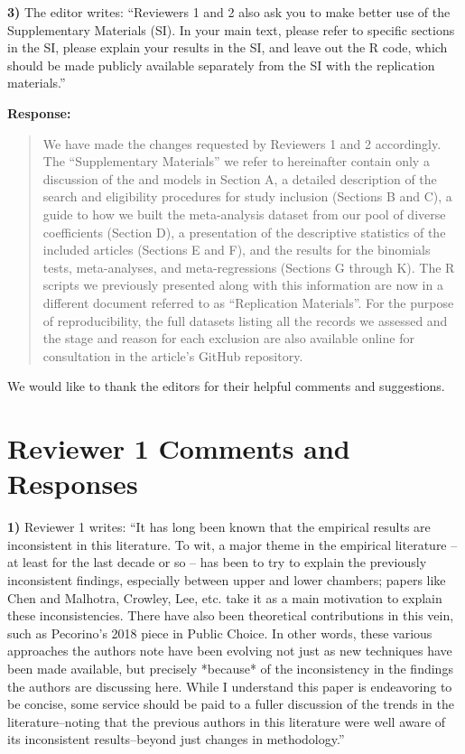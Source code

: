 \documentclass[a4paper,12pt]{article}
\begin{document}
\vspace{.3cm}

\noindent \textbf{3)} The editor writes: ``Reviewers 1 and 2 also ask you to make better use of the Supplementary Materials (SI). In your main text, please refer to specific sections in the SI, please explain your results in the SI, and leave out the R code, which should be made publicly available separately from the SI with the replication materials.''

\vspace{.3cm}

\noindent \textbf{Response:} 
\begin{quote}
    We have made the changes requested by Reviewers 1 and 2 accordingly. The ``Supplementary Materials'' we refer to hereinafter contain only a discussion of the \citet{weingast1981political} and \citet{primo2008distributive} models in Section A, a detailed description of the search and eligibility procedures for study inclusion (Sections B and C), a guide to how we built the meta-analysis dataset from our pool of diverse coefficients (Section D), a presentation of the descriptive statistics of the included articles (Sections E and F), and the results for the binomials tests, meta-analyses, and meta-regressions (Sections G through K). The R scripts we previously presented along with this information are now in a different document referred to as ``Replication Materials''. For the purpose of reproducibility, the full datasets listing all the records we assessed and the stage and reason for each exclusion are also available online for consultation in the article's GitHub repository. 
\end{quote}

\vspace{.3cm}

We would like to thank the editors for their helpful comments and suggestions.

\section*{Reviewer 1 Comments and Responses}

\noindent \textbf{1)} Reviewer 1 writes: ``It has long been known that the empirical results are inconsistent in this literature. To wit, a major theme in the empirical literature -- at least for the last decade or so -- has been to try to explain the previously inconsistent findings, especially between upper and lower chambers; papers like Chen and Malhotra, Crowley, Lee, etc. take it as a main motivation to explain these inconsistencies. There have also been theoretical contributions in this vein, such as Pecorino's 2018 piece in Public Choice. In other words, these various approaches the authors note have been evolving not just as new techniques have been made available, but precisely *because* of the inconsistency in the findings the authors are discussing here. While I understand this paper is endeavoring to be concise, some service should be paid to a fuller discussion of the trends in the literature--noting that the previous authors in this literature were well aware of its inconsistent results--beyond just changes in methodology.''
\end{document}
